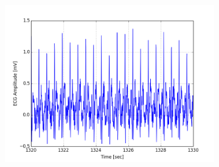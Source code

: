 \documentclass[paper=a4, fontsize=11pt]{scrartcl}
\numberwithin{equation}{section}		%
\numberwithin{figure}{section}			%
\numberwithin{table}{section}		    %
\begin{document}
\begin{appendices}
\begin{figure}[H]
\begin{subfigure}[b]{0.3\textwidth}
		\includegraphics[width=\textwidth]{sim/ecg_39}
	\end{subfigure}
\end{figure}


\end{appendices}
\end{document}
